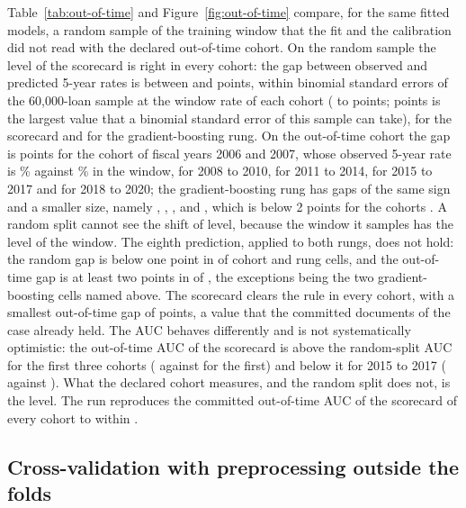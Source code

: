 Table~\ref{tab:out-of-time} and Figure~\ref{fig:out-of-time} compare, for the same fitted models, a random sample of the training window that the fit and the calibration did not read with the declared out-of-time cohort. On the random sample the level of the scorecard is right in every cohort: the gap between observed and predicted 5-year rates is between  and  points, within  binomial standard errors of the 60,000-loan sample at the window rate of each cohort ( to  points;  points is the largest value that a binomial standard error of this sample can take), for the scorecard and for the gradient-boosting rung. On the out-of-time cohort the gap is  points for the cohort of fiscal years 2006 and 2007, whose observed 5-year rate is \% against \% in the window,  for 2008 to 2010,  for 2011 to 2014,  for 2015 to 2017 and  for 2018 to 2020; the gradient-boosting rung has gaps of the same sign and a smaller size, namely , , ,  and , which is below 2 points for the cohorts . A random split cannot see the shift of level, because the window it samples has the level of the window. The eighth prediction, applied to both rungs, does not hold: the random gap is below one point in  of  cohort and rung cells, and the out-of-time gap is at least two points in  of , the exceptions being the two gradient-boosting cells named above. The scorecard clears the rule in every cohort, with a smallest out-of-time gap of  points, a value that the committed documents of the case already held. The AUC behaves differently and is not systematically optimistic: the out-of-time AUC of the scorecard is above the random-split AUC for the first three cohorts ( against  for the first) and below it for 2015 to 2017 ( against ). What the declared cohort measures, and the random split does not, is the level. The run reproduces the committed out-of-time AUC of the scorecard of every cohort to within .

\subsection{Cross-validation with preprocessing outside the folds}

